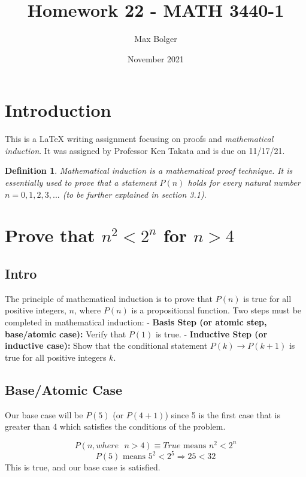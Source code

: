 \documentclass{article}
\title{Homework 22 - MATH 3440-1}
\author{Max Bolger}
\date{November 2021}
\newtheorem{definition}{Definition}
\begin{document}
\maketitle

\section{Introduction} This is a LaTeX writing assignment focusing on proofs and \textit{mathematical induction}. It was assigned by Professor Ken Takata and is due on 11/17/21.

\begin{definition}
Mathematical induction is a mathematical proof technique. It is essentially used to prove that a statement $P(n)$ holds for every natural number $n = 0, 1, 2, 3, ...$ (to be further explained in section 3.1).
\end{definition}

\section{Prove that $n^2 < 2^n$ for $n > 4$}

\subsection{Intro}
The principle of mathematical induction is to prove that $P(n)$ is true for all positive integers, $n$, where $P(n)$ is a propositional function. Two steps must be completed in mathematical induction:
\newline
\newline
- \textbf{Basis Step (or atomic step, base/atomic case):} Verify that $P(1)$ is true.
\newline
\newline
- \textbf{Inductive Step (or inductive case):} Show that the conditional statement $P(k) \rightarrow P(k+1)$ is true for all positive integers $k$.

\subsection{Base/Atomic Case}
Our base case will be $P(5)$ (or $P(4+1)$) since 5 is the first case that is greater than 4 which satisfies the conditions of the problem.

\begin{equation}
P(n, where \textrm{ } n>4) \equiv True \textrm{  means } n^2 < 2^n
\end{equation}
\newline
\newline
\begin{equation}
P(5) \textrm{  means } 5^2 < 2^5 \Longrightarrow 25 < 32
\end{equation}
\newline
\newline
This is true, and our base case is satisfied.
\end{document}
